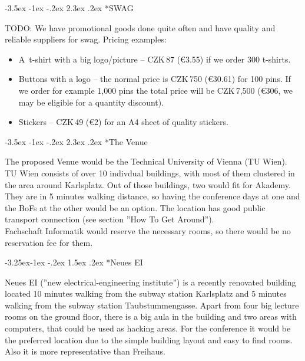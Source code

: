 \documentclass[10pt,a4paper]{article}
\makeatletter
\renewcommand\section{%
\@startsection{section}{1}{\z@}%
              {-3.5ex \@plus -1ex \@minus -.2ex}%
              {2.3ex \@plus.2ex}%
              {\color{kdelight}\sffamily\LARGE\bfseries}}
\renewcommand\subsection{%
\@startsection{subsection}{2}{\z@}%
              {-3.25ex\@plus -1ex \@minus -.2ex}%
              {1.5ex \@plus .2ex}%
              {\color{kdelight}\sffamily\Large\bfseries}}
\makeatother
\begin{document}
\cleardoublepage

\section*{SWAG}
TODO:
We have promotional goods done quite often and have quality and reliable suppliers for swag. Pricing
examples:

\begin{itemize}
\item A~t-shirt with a big logo/picture -- CZK\,87 (\euro{3.55}) if we order 300 t-shirts.
\item Buttons with a logo -- the normal price is CZK\,750 (\euro{30.61}) for 100 pins. If we order for example 
1,000 pins the total price will be CZK\,7,500 (\euro{306}, we may be eligible for a quantity
discount).
\item Stickers -- CZK\,49 (\euro{2}) for an A4 sheet of quality stickers.
\end{itemize}

\cleardoublepage

\section*{The Venue}
The proposed Venue would be the Technical University of Vienna (TU Wien). TU Wien consists of over 10 indivdual buildings, with most of them clustered in the area around Karlsplatz. Out of those buildings, two would fit for Akademy. They are in 5 minutes walking distance, so having the conference days at one and the BoFs at the other would be an option. The location has good public transport connection (see section ''How To Get Around'').\\
Fachschaft Informatik would reserve the necessary rooms, so there would be no reservation fee for them.

\subsection*{Neues EI}

Neues EI (''new electrical-engineering institute'') is a recently renovated building located 10 minutes walking from the subway station Karlsplatz and 5 minutes walking from the subway station Taubstummengasse. Apart from four big lecture rooms on the ground floor, there is a big aula in the building and two areas with computers, that could be used as hacking areas. For the conference it would be the preferred location due to the simple building layout and easy to find rooms. Also it is more representative than Freihaus.
\end{document}
